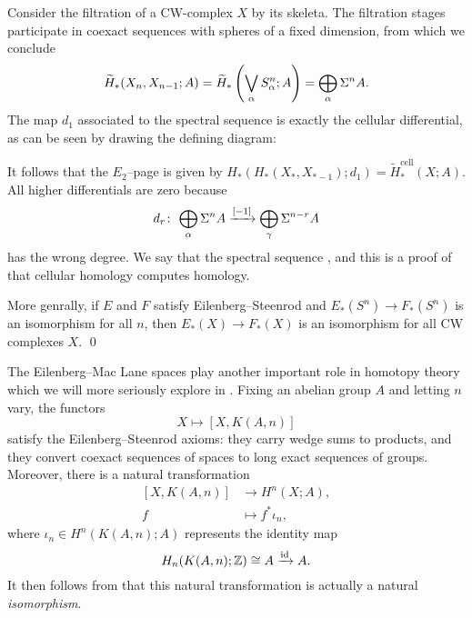 \begin{example}
Consider the filtration of a CW-complex $X$ by its skeleta.
The filtration stages participate in coexact sequences with spheres of a fixed dimension, from which we conclude \[\widetilde H_*(X_n, X_{n-1}; A) = \widetilde H_*\left(\bigvee_\alpha S^n_\alpha ; A\right) = \bigoplus_\alpha \Sigma^n A.\]
The map $d_1$ associated to the spectral sequence is exactly the cellular differential, as can be seen by drawing the defining diagram:
\begin{center}
\end{center}
It follows that the $E_2$--page is given by $H_*(H_*(X_*, X_{*-1}); d_1) = \widetilde H_*^{\mathrm{cell}}(X; A)$.
All higher differentials are zero because \[d_r\colon\thinspace \bigoplus_\alpha \Sigma^n A \xrightarrow{[-1]} \bigoplus_\gamma \Sigma^{n-r} A\] has the wrong degree.
We say that the spectral sequence , and this is a proof of that cellular homology computes homology.
\end{example}

\begin{corollary}\label{SpheresDetectEquivalenceOfCohomologyTheories}
More genrally, if $E$ and $F$ satisfy Eilenberg--Steenrod and $E_*(S^n) \to F_*(S^n)$ is an isomorphism for all $n$, then $E_*(X) \to F_*(X)$ is an isomorphism for all CW complexes $X$. \qed
\end{corollary}

\begin{example}\label{EMSpacesRepresentOrdinaryCoh}
The Eilenberg--Mac Lane spaces play another important role in homotopy theory which we will more seriously explore in .
Fixing an abelian group $A$ and letting $n$ vary, the functors \[X \mapsto [X, K(A, n)]\] satisfy the Eilenberg--Steenrod axioms: they carry wedge sums to products, and they convert coexact sequences of spaces to long exact sequences of groups.
Moreover, there is a natural transformation
\begin{align*}
{[X, K(A, n)]} & \to H^n(X; A), \\
f & \mapsto f^* \iota_n,
\end{align*}
where $\iota_n \in H^n(K(A, n); A)$ represents the identity map \[H_n(K(A, n); \mathbb Z) \cong A \xrightarrow{\operatorname{id}} A.\]
It then follows from  that this natural transformation is actually a natural \emph{isomorphism}.
\end{example}




